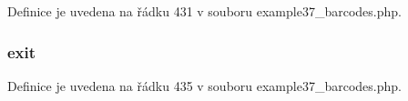 Definice je uvedena na řádku 431 v souboru example37\-\_\-barcodes.\-php.

\hypertarget{example37__barcodes_8php_a6733eb5f605d09eaede9845835d71c4e}{
\subsubsection[{exit}]{\setlength{\rightskip}{0pt plus 5cm}exit}}\label{example37__barcodes_8php_a6733eb5f605d09eaede9845835d71c4e}


Definice je uvedena na řádku 435 v souboru example37\-\_\-barcodes.\-php.

